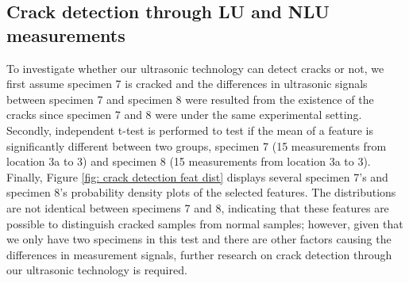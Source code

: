 \subsection{Crack detection through LU and NLU measurements}
To investigate whether our ultrasonic technology can detect cracks or not, we first assume specimen 7 is cracked and the differences in ultrasonic signals between specimen 7 and specimen 8 were resulted from the existence of the cracks since specimen 7 and 8 were under the same experimental setting. Secondly, independent t-test is performed to test if the mean of a feature is significantly different between two groups, specimen 7 (15 measurements from location 3a to 3) and specimen 8 (15 measurements from location 3a to 3). Finally, Figure \ref{fig: crack detection feat dist} displays several specimen 7's and specimen 8's probability density plots of the selected features. The distributions are not identical between specimens 7 and 8, indicating that these features are possible to distinguish cracked samples from normal samples; however, given that we only have two specimens in this test and there are other factors causing the differences in measurement signals, further research on crack detection through our ultrasonic technology is required.

